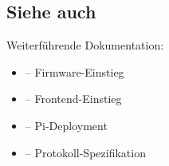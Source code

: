 \subsection{Siehe auch}
\label{subsec:projekt-siehe-auch}

Weiterführende Dokumentation:

\begin{itemize}
  \item {} -- Firmware-Einstieg
  \item {} -- Frontend-Einstieg
  \item {} -- Pi-Deployment
  \item {} -- Protokoll-Spezifikation
\end{itemize}
